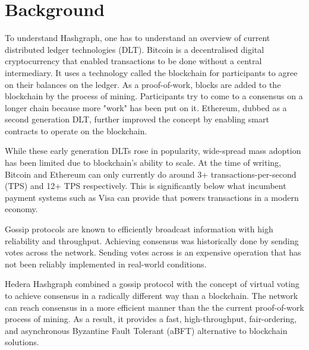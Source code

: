 \section{Background}

To understand Hashgraph, one has to understand an overview of current distributed ledger technologies (DLT). Bitcoin\cite{nakamoto2008peer} is a decentralised digital cryptocurrency that enabled transactions to be done without a central intermediary. It uses a technology called the blockchain for participants to agree on their balances on the ledger. As a proof-of-work, blocks are added to the blockchain by the process of mining. Participants try to come to a consensus on a longer chain because more "work" has been put on it. Ethereum\cite{wood2014ethereum}, dubbed as a second generation DLT, further improved the concept by enabling smart contracts to operate on the blockchain.

While these early generation DLTs rose in popularity, wide-spread mass adoption has been limited due to blockchain's ability to scale. At the time of writing, Bitcoin and Ethereum can only currently do around 3+ transactions-per-second (TPS)\cite{bitcointps} and 12+ TPS respectively\cite{ethereumtps}. This is significantly below what incumbent payment systems such as Visa can provide\cite{visafactsheet} that powers transactions in a modern economy.

Gossip protocols are known to efficiently broadcast information with high reliability and throughput\cite{birman}. Achieving consensus was historically done by sending votes across the network\cite{berman1989towards}. Sending votes across is an expensive operation that has not been reliably implemented in real-world conditions.

Hedera Hashgraph\cite{baird2016} combined a gossip protocol with the concept of virtual voting to achieve consensus in a radically different way than a blockchain. The network can reach consensus in a more efficient manner than the the current proof-of-work process of mining. As a result, it provides a fast, high-throughput, fair-ordering, and asynchronous Byzantine Fault Tolerant (aBFT) alternative to blockchain solutions.
